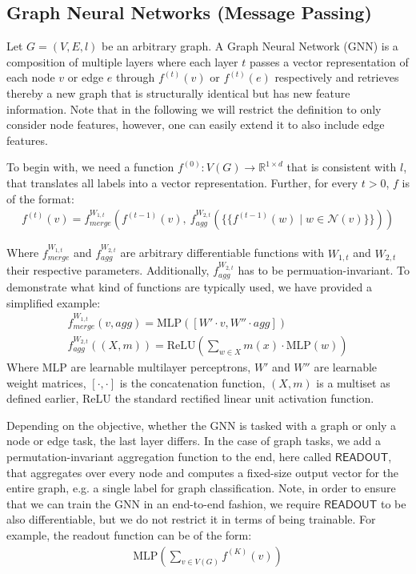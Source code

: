 \documentclass[11pt, dvipsnames, DIV=12]{scrreprt}
\theoremstyle{definition}
\newcommand{\MSopen}{\{\!\!\{}
\newcommand{\MSclose}{\}\!\!\}}
\begin{document}
\subsection{Graph Neural Networks (Message Passing)}\label{sec:GNN Defintion}
Let $G = (V, E, l)$ be an arbitrary graph. A Graph Neural Network (GNN) is a composition of multiple layers where each layer $t$ passes a vector representation of each node $v$ or edge $e$ through $f^{(t)}(v)$ or $f^{(t)}(e)$ respectively and retrieves thereby a new graph that is structurally identical but has new feature information. Note that in the following we will restrict the definition to only consider node features, however, one can easily extend it to also include edge features. 

To begin with, we need a function $f^{(0)}: V(G) \rightarrow \mathbb{R}^{1 \times d}$ that is consistent with $l$, that translates all labels into a vector representation. Further, for every $t > 0$, $f$ is of the format:
\begin{align}
f^{(t)}(v) = f^{W_{1,t}}_{merge} (f^{(t-1)}(v), \  f^{W_{2,t}}_{agg}( \MSopen f^{(t-1)}(w) \mid w \in \mathcal{N}(v) \MSclose ))
\end{align}

\noindent Where $f^{W_{1,t}}_{merge}$ and $f^{W_{2,t}}_{agg}$ are arbitrary differentiable functions with $W_{1,t}$ and $W_{2,t}$ their respective parameters. Additionally, $f^{W_{2,t}}_{agg}$ has to be permuation-invariant. To demonstrate what kind of functions are typically used, we have provided a simplified example:
\begin{align}
    f^{W_{1,t}}_{merge}(v, agg) = \text{MLP}([W' \cdot v, W'' \cdot agg])\\
    f^{W_{2,t}}_{agg}( (X,m)) = \text{ReLU}(\sum_{w \in X} m(x) \cdot \text{MLP}(w))
\end{align}
\noindent Where MLP are learnable multilayer perceptrons, $W'$ and $W''$ are learnable weight matrices, $[\cdot, \cdot]$ is the concatenation function, $(X, m)$ is a multiset as defined earlier, ReLU the standard rectified linear unit activation function.

Depending on the objective, whether the GNN is tasked with a graph or only a node or edge task, the last layer differs. In the case of graph tasks, we add a permutation-invariant aggregation function to the end, here called $\textsf{READOUT}$, that aggregates over every node and computes a fixed-size output vector for the entire graph, e.g. a single label for graph classification. Note, in order to ensure that we can train the GNN in an end-to-end fashion, we require $\textsf{READOUT}$ to be also differentiable, but we do not restrict it in terms of being trainable. For example, the readout function can be of the form: 
\begin{align}
    \text{MLP}(\sum_{v \in V(G)} f^{(K)}(v))
\end{align}
\end{document}
